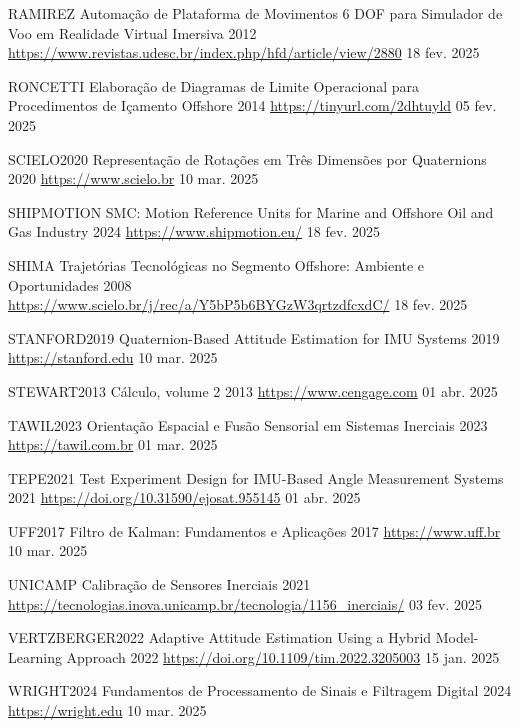     {RAMIREZ}
    {Automação de Plataforma de Movimentos 6 DOF para Simulador de Voo em Realidade Virtual Imersiva}
    {2012}
    {\url{https://www.revistas.udesc.br/index.php/hfd/article/view/2880}}
    {18 fev. 2025}

    {RONCETTI}
    {Elaboração de Diagramas de Limite Operacional para Procedimentos de Içamento Offshore}
    {2014}
    {\url{https://tinyurl.com/2dhtuyld}}
    {05 fev. 2025}

    {SCIELO2020}
    {Representação de Rotações em Três Dimensões por Quaternions}
    {2020}
    {\url{https://www.scielo.br}}
    {10 mar. 2025}

    {SHIPMOTION}
    {SMC: Motion Reference Units for Marine and Offshore Oil and Gas Industry}
    {2024}
    {\url{https://www.shipmotion.eu/}}
    {18 fev. 2025}

    {SHIMA}
    {Trajetórias Tecnológicas no Segmento Offshore: Ambiente e Oportunidades}
    {2008}
    {\url{https://www.scielo.br/j/rec/a/Y5bP5b6BYGzW3qrtzdfcxdC/}}
    {18 fev. 2025}

    {STANFORD2019}
    {Quaternion-Based Attitude Estimation for IMU Systems}
    {2019}
    {\url{https://stanford.edu}}
    {10 mar. 2025}

    {STEWART2013}
    {Cálculo, volume 2}
    {2013}
    {\url{https://www.cengage.com}}
    {01 abr. 2025}

    {TAWIL2023}
    {Orientação Espacial e Fusão Sensorial em Sistemas Inerciais}
    {2023}
    {\url{https://tawil.com.br}}
    {01 mar. 2025}

    {TEPE2021}
    {Test Experiment Design for IMU-Based Angle Measurement Systems}
    {2021}
    {\url{https://doi.org/10.31590/ejosat.955145}}
    {01 abr. 2025}

    {UFF2017}
    {Filtro de Kalman: Fundamentos e Aplicações}
    {2017}
    {\url{https://www.uff.br}}
    {10 mar. 2025}

    {UNICAMP}
    {Calibração de Sensores Inerciais}
    {2021}
    {\url{https://tecnologias.inova.unicamp.br/tecnologia/1156_inerciais/}}
    {03 fev. 2025}

    {VERTZBERGER2022}
    {Adaptive Attitude Estimation Using a Hybrid Model-Learning Approach}
    {2022}
    {\url{https://doi.org/10.1109/tim.2022.3205003}}
    {15 jan. 2025}

    {WRIGHT2024}
    {Fundamentos de Processamento de Sinais e Filtragem Digital}
    {2024}
    {\url{https://wright.edu}}
    {10 mar. 2025}

\phantom{a}
